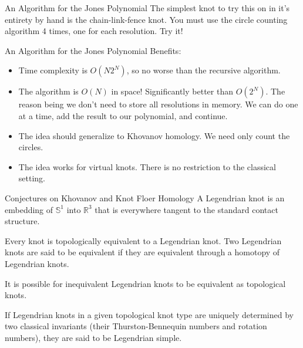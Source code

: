 \documentclass{beamer}
\begin{document}
    \begin{frame}{An Algorithm for the Jones Polynomial}
        The simplest knot to try this on in it's entirety by hand is the
        chain-link-fence knot. You must use the circle counting algorithm
        4 times, one for each resolution. Try it!
    \end{frame}
    \begin{frame}{An Algorithm for the Jones Polynomial}
        Benefits:
        \begin{itemize}
            \item Time complexity is $O(N2^{N})$, so no worse than the
                  recursive algorithm.
            \item The algorithm is $O(N)$ in space! Significantly better than
                  $O(2^{N})$. The reason being we don't need to store all
                  resolutions in memory. We can do one at a time, add the
                  result to our polynomial, and continue.
            \item The idea should generalize to Khovanov homology. We need
                  only count the circles.
            \item The idea works for virtual knots. There is no restriction to
                  the classical setting.
        \end{itemize}
    \end{frame}
    \begin{frame}{Conjectures on Khovanov and Knot Floer Homology}
        A Legendrian knot is an embedding of $\mathbb{S}^{1}$ into
        $\mathbb{R}^{3}$ that is everywhere tangent to the standard
        contact structure.
        \par\hfill\par
        Every knot is topologically equivalent to a Legendrian knot. Two
        Legendrian knots are said to be equivalent if they are equivalent
        through a homotopy of Legendrian knots.
        \par\hfill\par
        It is possible for inequivalent
        Legendrian knots to be equivalent as topological knots.
        \par\hfill\par
        If Legendrian knots in a given topological knot type are uniquely
        determined by two classical invariants (their Thurston-Bennequin
        numbers and rotation numbers), they are said to be Legendrian simple.
    \end{frame}
\end{document}
